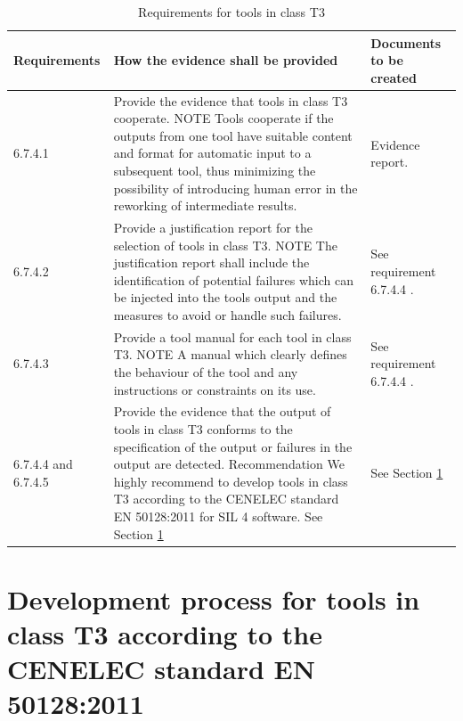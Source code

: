 \documentclass{template/openetcs_report}
\begin{document}
{\footnotesize\sffamily\centering
\begin{longtable}{|p{2cm}|p{9cm}|p{3cm}|}
\caption{Requirements for tools in class T3}\\
\hline
\bfseries Requirements & \bfseries How the evidence shall be provided & \bfseries Documents to be created\\
\hline
\hline
\endhead
\hline
\endfoot

6.7.4.1 & Provide the evidence that tools in class T3 cooperate. 
\linebreak
\linebreak 
NOTE \linebreak
Tools cooperate if the outputs from one tool have suitable content and format for automatic input to a subsequent tool, thus minimizing the possibility of introducing human error in the reworking of intermediate results. & Evidence report.\\ 
\hline
6.7.4.2 & Provide a justification report for the selection of tools in class T3.
\linebreak
\linebreak 
NOTE \linebreak
The justification report shall include the identification of potential failures which can be injected into the tools output and the measures to avoid or handle such failures. & See requirement 6.7.4.4 .\\ 
\hline
6.7.4.3 & Provide a tool manual for each tool in class T3.
\linebreak
\linebreak
NOTE \linebreak
A manual which clearly defines the behaviour of the tool and any instructions or constraints on its use. & See requirement 6.7.4.4 .\\ 
\hline
6.7.4.4 and 6.7.4.5 & Provide the evidence that the output of tools in class T3 conforms to the specification of the output or failures in the output are detected.
\linebreak
\linebreak
Recommendation \linebreak
We highly recommend to develop tools in class T3 according to the CENELEC standard EN 50128:2011 for SIL 4 software.
See Section \ref{DevT3} & See Section \ref{DevT3}\\ 
\hline
\end{longtable}}


\section{Development process for tools in class T3 according to the CENELEC standard EN 50128:2011}
\label{DevT3}
\end{document}
